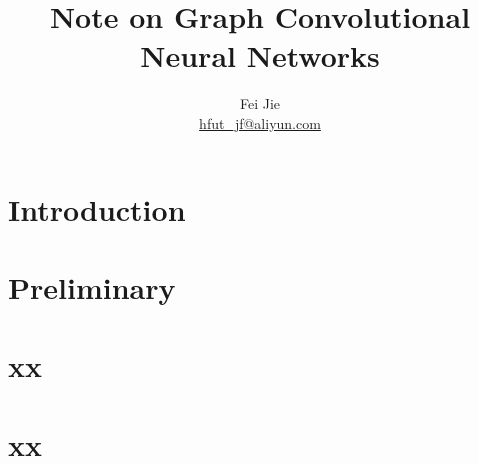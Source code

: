\documentclass{article}
\title{Note on Graph Convolutional Neural Networks}
\author{Fei Jie \\ \href{}{hfut\_jf@aliyun.com}}
\begin{document}
\maketitle
\thispagestyle{firstpage}

\section{Introduction}


\section{Preliminary}


\section{xx}


\section{xx}
\end{document}
